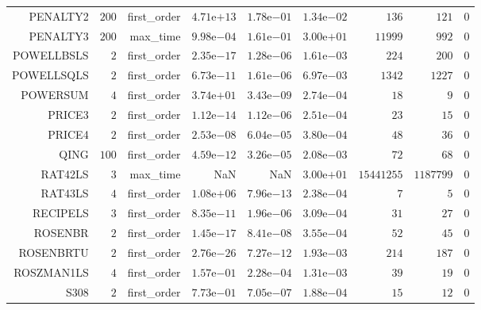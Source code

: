 \begin{longtable}{rrrrrrrrr}
PENALTY2 & \(   200\) & first\_order & \( 4.71\)e\(+13\) & \( 1.78\)e\(-01\) & \( 1.34\)e\(-02\) & \(   136\) & \(   121\) & \(     0\) \\
PENALTY3 & \(   200\) & max\_time & \( 9.98\)e\(-04\) & \( 1.61\)e\(-01\) & \( 3.00\)e\(+01\) & \( 11999\) & \(   992\) & \(     0\) \\
POWELLBSLS & \(     2\) & first\_order & \( 2.35\)e\(-17\) & \( 1.28\)e\(-06\) & \( 1.61\)e\(-03\) & \(   224\) & \(   200\) & \(     0\) \\
POWELLSQLS & \(     2\) & first\_order & \( 6.73\)e\(-11\) & \( 1.61\)e\(-06\) & \( 6.97\)e\(-03\) & \(  1342\) & \(  1227\) & \(     0\) \\
POWERSUM & \(     4\) & first\_order & \( 3.74\)e\(+01\) & \( 3.43\)e\(-09\) & \( 2.74\)e\(-04\) & \(    18\) & \(     9\) & \(     0\) \\
PRICE3 & \(     2\) & first\_order & \( 1.12\)e\(-14\) & \( 1.12\)e\(-06\) & \( 2.51\)e\(-04\) & \(    23\) & \(    15\) & \(     0\) \\
PRICE4 & \(     2\) & first\_order & \( 2.53\)e\(-08\) & \( 6.04\)e\(-05\) & \( 3.80\)e\(-04\) & \(    48\) & \(    36\) & \(     0\) \\
QING & \(   100\) & first\_order & \( 4.59\)e\(-12\) & \( 3.26\)e\(-05\) & \( 2.08\)e\(-03\) & \(    72\) & \(    68\) & \(     0\) \\
RAT42LS & \(     3\) & max\_time &       NaN &       NaN & \( 3.00\)e\(+01\) & \(15441255\) & \(1187799\) & \(     0\) \\
RAT43LS & \(     4\) & first\_order & \( 1.08\)e\(+06\) & \( 7.96\)e\(-13\) & \( 2.38\)e\(-04\) & \(     7\) & \(     5\) & \(     0\) \\
RECIPELS & \(     3\) & first\_order & \( 8.35\)e\(-11\) & \( 1.96\)e\(-06\) & \( 3.09\)e\(-04\) & \(    31\) & \(    27\) & \(     0\) \\
ROSENBR & \(     2\) & first\_order & \( 1.45\)e\(-17\) & \( 8.41\)e\(-08\) & \( 3.55\)e\(-04\) & \(    52\) & \(    45\) & \(     0\) \\
ROSENBRTU & \(     2\) & first\_order & \( 2.76\)e\(-26\) & \( 7.27\)e\(-12\) & \( 1.93\)e\(-03\) & \(   214\) & \(   187\) & \(     0\) \\
ROSZMAN1LS & \(     4\) & first\_order & \( 1.57\)e\(-01\) & \( 2.28\)e\(-04\) & \( 1.31\)e\(-03\) & \(    39\) & \(    19\) & \(     0\) \\
S308 & \(     2\) & first\_order & \( 7.73\)e\(-01\) & \( 7.05\)e\(-07\) & \( 1.88\)e\(-04\) & \(    15\) & \(    12\) & \(     0\) \\

\end{longtable}
